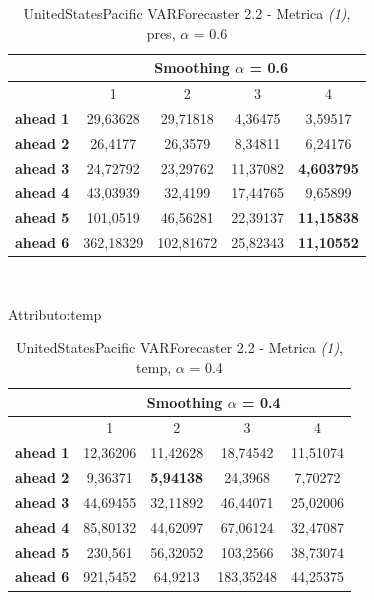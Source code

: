 \documentclass[12pt,a4paper,oneside,openright]{book}
\begin{document}
\medskip

\begin{table}[H]
\centering
\begin{tabular}{|c|c|c|c|c|}
\hline
 & \multicolumn{4}{|c|}{Smoothing $\alpha$ = 0.6} \\
\hline
& 1 & 2 & 3 & 4 \\
\hline
\textbf{ahead 1} & 29,63628 & 29,71818 & 4,36475 & 3,59517 \\
\hline
\textbf{ahead 2} & 26,4177 & 26,3579 & 8,34811 & 6,24176 \\ 
\hline
\textbf{ahead 3} & 24,72792 & 23,29762 & 11,37082 & \textbf{4,603795} \\
\hline
\textbf{ahead 4} & 43,03939 & 32,4199 & 17,44765 & 9,65899\\ 
\hline
\textbf{ahead 5} & 101,0519 & 46,56281 & 22,39137 & \textbf{11,15838}\\
\hline
\textbf{ahead 6} & 362,18329 & 102,81672 & 25,82343 & \textbf{11,10552}\\ 
\hline
\end{tabular} \\
\caption{UnitedStatesPacific VARForecaster 2.2 - Metrica \textit{(1)}, pres, $\alpha$ = 0.6}
\end{table} 

\medskip

Attributo:temp \\ 

\begin{table}[H]
\centering
\begin{tabular}{|c|c|c|c|c|}
\hline
 & \multicolumn{4}{|c|}{Smoothing $\alpha$ = 0.4} \\
\hline
& 1 & 2 & 3 & 4 \\
\hline
\textbf{ahead 1} & 12,36206 & 11,42628 & 18,74542 & 11,51074 \\
\hline
\textbf{ahead 2} & 9,36371 & \textbf{5,94138} & 24,3968 & 7,70272\\ 
\hline
\textbf{ahead 3} & 44,69455 & 32,11892 & 46,44071 & 25,02006\\
\hline
\textbf{ahead 4} & 85,80132 & 44,62097 & 67,06124 & 32,47087\\ 
\hline
\textbf{ahead 5} & 230,561 & 56,32052 & 103,2566 & 38,73074\\
\hline
\textbf{ahead 6} & 921,5452 & 64,9213 & 183,35248 & 44,25375\\ 
\hline
\end{tabular} \\
\caption{UnitedStatesPacific VARForecaster 2.2 - Metrica \textit{(1)}, temp, $\alpha$ = 0.4}
\end{table} 
\end{document}
